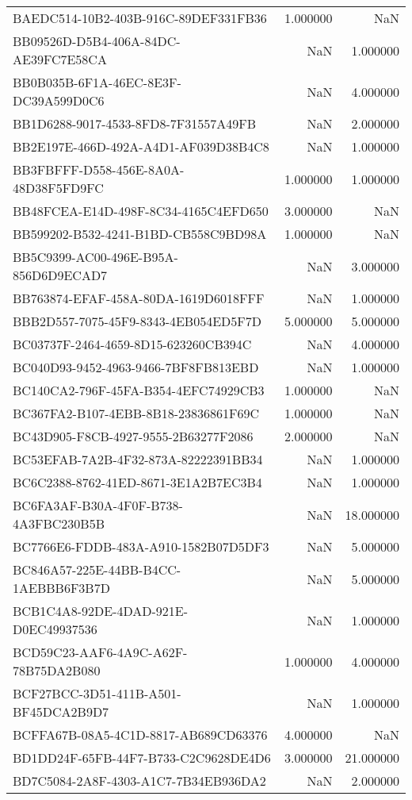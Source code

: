\begin{tabular}{lrr}
BAEDC514-10B2-403B-916C-89DEF331FB36 & 1.000000 & NaN \\
BB09526D-D5B4-406A-84DC-AE39FC7E58CA & NaN & 1.000000 \\
BB0B035B-6F1A-46EC-8E3F-DC39A599D0C6 & NaN & 4.000000 \\
BB1D6288-9017-4533-8FD8-7F31557A49FB & NaN & 2.000000 \\
BB2E197E-466D-492A-A4D1-AF039D38B4C8 & NaN & 1.000000 \\
BB3FBFFF-D558-456E-8A0A-48D38F5FD9FC & 1.000000 & 1.000000 \\
BB48FCEA-E14D-498F-8C34-4165C4EFD650 & 3.000000 & NaN \\
BB599202-B532-4241-B1BD-CB558C9BD98A & 1.000000 & NaN \\
BB5C9399-AC00-496E-B95A-856D6D9ECAD7 & NaN & 3.000000 \\
BB763874-EFAF-458A-80DA-1619D6018FFF & NaN & 1.000000 \\
BBB2D557-7075-45F9-8343-4EB054ED5F7D & 5.000000 & 5.000000 \\
BC03737F-2464-4659-8D15-623260CB394C & NaN & 4.000000 \\
BC040D93-9452-4963-9466-7BF8FB813EBD & NaN & 1.000000 \\
BC140CA2-796F-45FA-B354-4EFC74929CB3 & 1.000000 & NaN \\
BC367FA2-B107-4EBB-8B18-23836861F69C & 1.000000 & NaN \\
BC43D905-F8CB-4927-9555-2B63277F2086 & 2.000000 & NaN \\
BC53EFAB-7A2B-4F32-873A-82222391BB34 & NaN & 1.000000 \\
BC6C2388-8762-41ED-8671-3E1A2B7EC3B4 & NaN & 1.000000 \\
BC6FA3AF-B30A-4F0F-B738-4A3FBC230B5B & NaN & 18.000000 \\
BC7766E6-FDDB-483A-A910-1582B07D5DF3 & NaN & 5.000000 \\
BC846A57-225E-44BB-B4CC-1AEBBB6F3B7D & NaN & 5.000000 \\
BCB1C4A8-92DE-4DAD-921E-D0EC49937536 & NaN & 1.000000 \\
BCD59C23-AAF6-4A9C-A62F-78B75DA2B080 & 1.000000 & 4.000000 \\
BCF27BCC-3D51-411B-A501-BF45DCA2B9D7 & NaN & 1.000000 \\
BCFFA67B-08A5-4C1D-8817-AB689CD63376 & 4.000000 & NaN \\
BD1DD24F-65FB-44F7-B733-C2C9628DE4D6 & 3.000000 & 21.000000 \\
BD7C5084-2A8F-4303-A1C7-7B34EB936DA2 & NaN & 2.000000 \\

\end{tabular}
